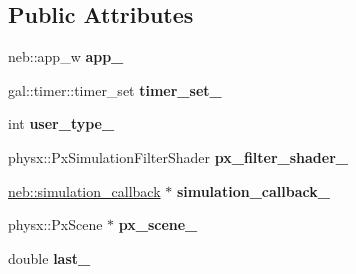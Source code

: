 \subsection*{\-Public \-Attributes}
\begin{DoxyCompactItemize}
\item 
\hypertarget{classneb_1_1scene_1_1scene_a8527e6bb51b445c7dc99efcaaa8198c1}{neb\-::app\-\_\-w {\bfseries app\-\_\-}}\label{classneb_1_1scene_1_1scene_a8527e6bb51b445c7dc99efcaaa8198c1}

\item 
\hypertarget{classneb_1_1scene_1_1scene_a99398d74631477541fe414f7455c6560}{gal\-::timer\-::timer\-\_\-set {\bfseries timer\-\_\-set\-\_\-}}\label{classneb_1_1scene_1_1scene_a99398d74631477541fe414f7455c6560}

\item 
\hypertarget{classneb_1_1scene_1_1scene_a0c7cc06520332f35eaaa43d06f303e17}{int {\bfseries user\-\_\-type\-\_\-}}\label{classneb_1_1scene_1_1scene_a0c7cc06520332f35eaaa43d06f303e17}

\item 
\hypertarget{classneb_1_1scene_1_1scene_a4080cb2f22531e88d5562834011dd8e0}{physx\-::\-Px\-Simulation\-Filter\-Shader {\bfseries px\-\_\-filter\-\_\-shader\-\_\-}}\label{classneb_1_1scene_1_1scene_a4080cb2f22531e88d5562834011dd8e0}

\item 
\hypertarget{classneb_1_1scene_1_1scene_a65cada9f46dc732db546eff588c9eae8}{\hyperlink{classneb_1_1simulation__callback}{neb\-::simulation\-\_\-callback} $\ast$ {\bfseries simulation\-\_\-callback\-\_\-}}\label{classneb_1_1scene_1_1scene_a65cada9f46dc732db546eff588c9eae8}

\item 
\hypertarget{classneb_1_1scene_1_1scene_a94b89a56deddecfba35b9829f8315ad8}{physx\-::\-Px\-Scene $\ast$ {\bfseries px\-\_\-scene\-\_\-}}\label{classneb_1_1scene_1_1scene_a94b89a56deddecfba35b9829f8315ad8}

\item 
\hypertarget{classneb_1_1scene_1_1scene_a37110b74e5abbe2e88c92815f533a937}{double {\bfseries last\-\_\-}}\label{classneb_1_1scene_1_1scene_a37110b74e5abbe2e88c92815f533a937}

\end{DoxyCompactItemize}


